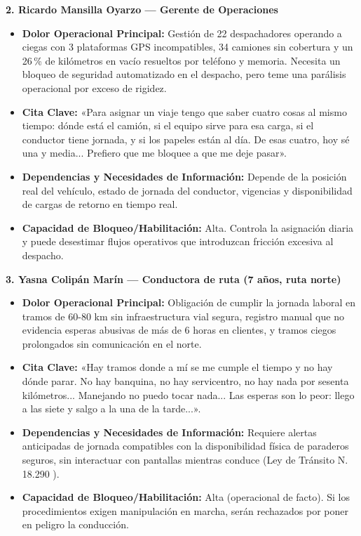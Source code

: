 \textbf{2. Ricardo Mansilla Oyarzo --- Gerente de Operaciones}
\begin{itemize}
    \item \textbf{Dolor Operacional Principal:} Gestión de 22 despachadores operando a ciegas con 3 plataformas GPS incompatibles, 34 camiones sin cobertura y un 26\,\% de kilómetros en vacío resueltos por teléfono y memoria. Necesita un bloqueo de seguridad automatizado en el despacho, pero teme una parálisis operacional por exceso de rigidez.
    \item \textbf{Cita Clave:} «Para asignar un viaje tengo que saber cuatro cosas al mismo tiempo: dónde está el camión, si el equipo sirve para esa carga, si el conductor tiene jornada, y si los papeles están al día. De esas cuatro, hoy sé una y media... Prefiero que me bloquee a que me deje pasar».
    \item \textbf{Dependencias y Necesidades de Información:} Depende de la posición real del vehículo, estado de jornada del conductor, vigencias y disponibilidad de cargas de retorno en tiempo real.
    \item \textbf{Capacidad de Bloqueo/Habilitación:} Alta. Controla la asignación diaria y puede desestimar flujos operativos que introduzcan fricción excesiva al despacho.
\end{itemize}

\textbf{3. Yasna Colipán Marín --- Conductora de ruta (7 años, ruta norte)}
\begin{itemize}
    \item \textbf{Dolor Operacional Principal:} Obligación de cumplir la jornada laboral en tramos de 60-80 km sin infraestructura vial segura, registro manual que no evidencia esperas abusivas de más de 6 horas en clientes, y tramos ciegos prolongados sin comunicación en el norte.
    \item \textbf{Cita Clave:} «Hay tramos donde a mí se me cumple el tiempo y no hay dónde parar. No hay banquina, no hay servicentro, no hay nada por sesenta kilómetros... Manejando no puedo tocar nada... Las esperas son lo peor: llego a las siete y salgo a la una de la tarde...».
    \item \textbf{Dependencias y Necesidades de Información:} Requiere alertas anticipadas de jornada compatibles con la disponibilidad física de paraderos seguros, sin interactuar con pantallas mientras conduce (Ley de Tránsito N.\textordmasculine{} 18.290 \parencite{ley18290}).
    \item \textbf{Capacidad de Bloqueo/Habilitación:} Alta (operacional de facto). Si los procedimientos exigen manipulación en marcha, serán rechazados por poner en peligro la conducción.
\end{itemize}

